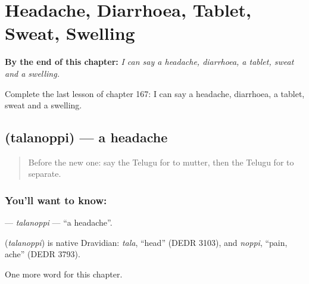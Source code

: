 
\chapter{Headache, Diarrhoea, Tablet, Sweat, Swelling}
\label{ch:te-headache-diarrhoea-tablet-sweat-swelling}

\begin{chapteropening}
\textbf{By the end of this chapter:} \emph{I can say a headache, diarrhoea, a tablet, sweat and a swelling.}

Complete the last lesson of chapter 167: I can say a headache, diarrhoea, a tablet, sweat and a swelling.
\end{chapteropening}

\section[\texorpdfstring{\te{తలనొప్పి} (talanoppi)}{తలనొప్పి (talanoppi)}]{ (talanoppi) — a headache}

\label{lesson:TE-C167-talanoppi}



\begin{quote}
Before the new one: say the Telugu for to mutter, then the Telugu for to separate.
\end{quote}

\subsection*{You'll want to know: }
\textbf{} — \emph{talanoppi} — \textquotedblleft{}a headache\textquotedblright{}.

\begin{cousinweb}
\textbf{} (\emph{talanoppi}) is native Dravidian: \emph{tala}, \textquotedblleft{}head\textquotedblright{} (DEDR 3103), and \emph{noppi}, \textquotedblleft{}pain, ache\textquotedblright{} (DEDR 3793).
\end{cousinweb}

\begin{grammarlens}[title={What you've built}]
One more word for this chapter.
\end{grammarlens}

